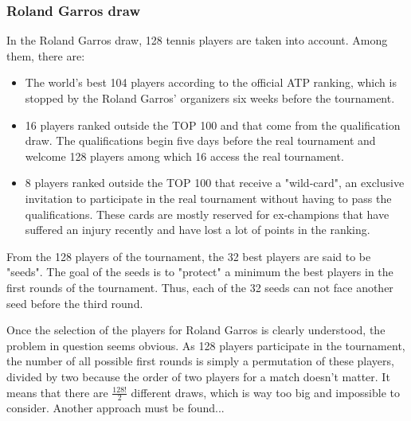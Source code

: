 \documentclass[12pt]{article}
\begin{document}
\subsubsection*{Roland Garros draw}
In the Roland Garros draw, 128 tennis players are taken into account. Among them, there are:
\begin{itemize}
    \item The world's best 104 players according to the official ATP ranking, which is stopped by the Roland Garros' organizers six weeks before the tournament.
    \item 16 players ranked outside the TOP 100 and that come from the qualification draw. The qualifications begin five days before the real tournament and welcome 128 players among which 16 access the real tournament.
    \item 8 players ranked outside the TOP 100 that receive a "wild-card", an exclusive invitation to participate in the real tournament without having to pass the qualifications. These cards are mostly reserved for ex-champions that have suffered an injury recently and have lost a lot of points in the ranking.
\end{itemize}
From the 128 players of the tournament, the 32 best players are said to be "seeds". The goal of the seeds is to "protect" a minimum the best players in the first rounds of the tournament. Thus, each of the 32 seeds can not face another seed before the third round.

Once the selection of the players for Roland Garros is clearly understood, the problem in question seems obvious. As 128 players participate in the tournament, the number of all possible first rounds is simply a permutation of these players, divided by two because the order of two players for a match doesn't matter. It means that there are $\frac{128!}{2}$ different draws, which is way too big and impossible to consider. Another approach must be found...
\end{document}

